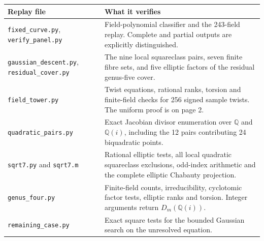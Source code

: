 \documentclass[12pt]{article}
\newcommand{\Q}{\mathbb Q}\newcommand{\Z}{\mathbb Z}
\begin{document}
{\small\begin{tabular}{@{}p{.34\linewidth}p{.61\linewidth}@{}}
\toprule
\textbf{Replay file}&\textbf{What it verifies}\\ \midrule
\texttt{fixed\_curve.py}, \texttt{verify\_panel.py} & Field-polynomial classifier and the 243-field replay. Complete and partial outputs are explicitly distinguished.\\
\texttt{gaussian\_descent.py}, \texttt{residual\_cover.py} & The nine local squareclass pairs, seven finite fibre sets, and five elliptic factors of the residual genus-five cover.\\
\texttt{field\_tower.py} & Twist equations, rational ranks, torsion and finite-field checks for 256 signed sample twists. The uniform proof is on page 2.\\
\texttt{quadratic\_pairs.py} & Exact Jacobian divisor enumeration over $\Q$ and $\Q(i)$, including the 12 pairs contributing 24 biquadratic points.\\
\texttt{sqrt7.py} and \texttt{sqrt7.m} & Rational elliptic tests, all local quadratic squareclass exclusions, odd-index arithmetic and the complete elliptic Chabauty projection.\\
\texttt{genus\_four.py} & Finite-field counts, irreducibility, cyclotomic factor tests, elliptic ranks and torsion. Integer arguments return $D_m(\Q(i))$.\\
\texttt{remaining\_case.py} & Exact square tests for the bounded Gaussian search on the unresolved equation.\\
\bottomrule
\end{tabular}}
\end{document}
